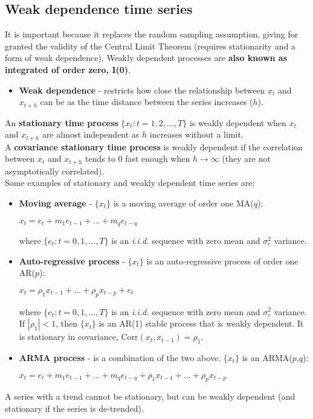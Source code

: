 \documentclass[10pt, a4paper, landscape]{extarticle}
\newcommand{\Corr}{\mathrm{Corr}}
\begin{document}
\begin{multicols}{3}
	\subsection*{Weak dependence time series}
		It is important because it replaces the random sampling assumption, giving for granted the validity of the Central Limit Theorem (requires stationarity and a form of weak dependence). Weakly dependent processes are \textbf{also known as integrated of order zero, I(0)}.
		\begin{itemize}[leftmargin=*]
			\item \textbf{Weak dependence} - restricts how close the relationship between $x_t$ and $x_{t+h}$ can be as the time distance between the series increases ($h$).
		\end{itemize}
		An \textbf{stationary time process} $\lbrace x_t: t = 1, 2, ..., T \rbrace$ is weakly dependent when $x_t$ and $x_{t+h}$ are almost independent as $h$ increases without a limit. \\
		A \textbf{covariance stationary time process} is weakly dependent if the correlation between $x_t$ and $x_{t+h}$ tends to $0$ fast enough when $h \rightarrow \infty$ (they are not asymptotically correlated). \\
		Some examples of stationary and weakly dependent time series are:
		\begin{itemize}[leftmargin=*]
			\item \textbf{Moving average} - $\lbrace x_t \rbrace$ is a moving average of order one MA($q$):
			\begin{center}
				$x_t = e_t + m_1 e_{t-1} + ... + m_q e_{t-q}$
			\end{center}
			where $\lbrace e_t: t = 0, 1, ..., T \rbrace$ is an \textsl{i.i.d.} sequence with zero mean and $\sigma^2_e$ variance.
			\item \textbf{Auto-regressive process} - $\lbrace x_t \rbrace$ is an auto-regressive process of order one AR($p$):
			\begin{center}
				$x_t = \rho_1 x_{t-1} + ... + \rho_p x_{t-p} + e_t$
			\end{center}
			where $\lbrace e_t: t = 0, 1, ..., T \rbrace$ is an \textsl{i.i.d.} sequence with zero mean and $\sigma^2_e$ variance. \\
			If $|\rho_1|<1$, then $\lbrace x_t \rbrace$ is an AR(1) stable process that is weakly dependent. It is stationary in covariance, $\Corr(x_t, x_{t-1}) = \rho_1$.
			\item \textbf{ARMA process} - is a combination of the two above. $\lbrace x_t \rbrace$ is an ARMA($p$,$q$):
			\begin{center}
				$x_t = e_t + m_1 e_{t-1} + ... + m_q e_{t-q} + \rho_1 x_{t-1} + ... + \rho_p x_{t-p}$
			\end{center}
		\end{itemize}
		A series with a trend cannot be stationary, but can be weakly dependent (and stationary if the series is de-trended).
\columnbreak

\end{multicols}
\end{document}
